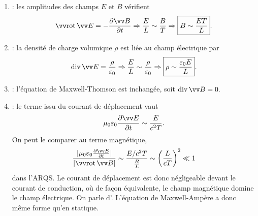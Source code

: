 \documentclass[12pt,fancy]{cours}
\begin{document}
\begin{enumerate}
  \item {} : les amplitudes des champs $E$ et $B$ vérifient
  \begin{equation}
    \rot\E = -\dr{\B}{t} \Rightarrow \frac{E}{L} \sim \frac{B}{T} \Rightarrow \boxed{B \sim \frac{E T}{L}}.
   \end{equation}
   \item {} : la densité de charge volumique $\rho$ est liée au champ électrique par
    \begin{equation}
      \dive\E = \frac{\rho}{\epz} \Rightarrow \frac{E}{L} \sim \frac{\rho}{\epz} \Rightarrow \boxed{\rho \sim \frac{\epz E}{L}}.
    \end{equation}
    \item {} : l’équation de Maxwell-Thomson est inchangée,  soit
      $\dive\B = 0.$
   \item {} : le terme issu du courant de déplacement vaut
   \begin{equation}
     \mu_0 \epz \dr{\E}{t} \sim \frac{E}{c^2 T}.
   \end{equation}
   On peut le comparer au terme magnétique,  
   \begin{equation}
     \frac{\norme{\mu_0 \epz \dr{\E}{t}}}{\norme{\rot\B}} \sim \frac{E/c^2T}{\frac{B}{L}} \sim \left(\frac{L}{cT}\right)^2 \ll 1
   \end{equation}
   dans l’ARQS. Le courant de déplacement est donc négligeable devant le courant de conduction, où de façon équivalente, le champ magnétique domine le champ électrique. On parle d’. L’équation de Maxwell-Ampère  a donc même forme qu’en statique. 
\end{enumerate}

\end{document}
